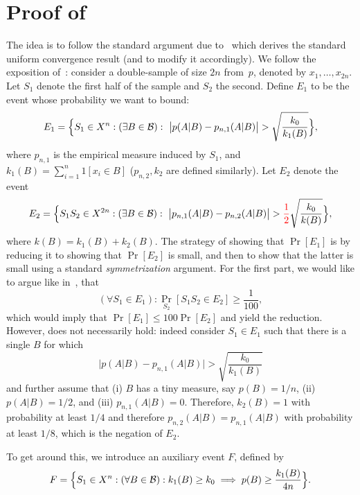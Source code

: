 \documentclass{article}
\newcommand{\B}{{\cal B}}
\newcommand{\new}[1]{\textcolor{red}{#1}}
\begin{document}
\section{Proof of }

The idea is to follow the standard argument due to~\cite{vapnik} 
which derives the standard uniform convergence result (and to modify it accordingly). 
We follow the exposition of~\cite{anthony}:
consider a double-sample of size $2n$ from~$p$, denoted by $x_1,\ldots,x_{2n}$.
Let $S_1$ denote the first half of the sample and $S_2$ the second.
Define $E_1$ to be the event whose probability we want to bound:
\[E_1 = \Bigl\{ S_1\in X^n : (\exists B\in \B):~ 
\bigl\lvert p(A \vert B) - p_{n,1}(A \vert B) \bigr\rvert > 
\sqrt{\frac{k_0}{k_{1}(B)}} \Bigr\},\]
where $p_{n,1}$ is the empirical measure induced by $S_1$, 
and $k_{1}(B)=\sum_{i=1}^n 1[x_i\in B]$ ($p_{n,2}, k_{2}$ are defined similarly).
Let $E_2$ denote the event
\[E_2 = 
\Bigl\{
S_1S_2\in X^{2n} : (\exists B\in\B):~
\bigl\lvert p_{n,1}(A \vert B)   -  p_{n,2}(A \vert B) \bigr\rvert >  
\new{\frac{1}{2}}\sqrt{\frac{k_0}{k(B)}}
\Bigr\},
\]
where $k(B) = k_{1}(B)+k_{2}(B)$.
The strategy of showing that $\Pr[E_1]$ is by reducing it to showing that $\Pr[E_2]$ 
is small, and then to show that the latter is small using a standard \emph{symmetrization} argument. 
For the first part, we would like to argue like in~\cite{anthony}, that
\begin{equation}\label{eq:anthony} 
(\forall S_1\in E_1): \Pr_{S_2}[S_1S_2\in E_2]\geq \frac{1}{100},
\end{equation}
which would imply that $\Pr[E_1]\leq 100\Pr[E_2]$ and yield the reduction.
However,  does not necessarily hold: indeed consider
$S_1\in E_1$ such that there is a single $B$ for which 
\[
\bigl\lvert p(A \vert B) - p_{n,1}(A \vert B) \bigr\rvert > 
\sqrt{\frac{k_0}{k_{1}(B)}}
\]
and further assume that 
(i) $B$ has a tiny measure, say $p(B) = 1/n$,
(ii) $p(A\vert B)= 1/2$, and
(iii) $p_{n,1}(A\vert B) = 0$.
Therefore, $k_2(B)=1$ with probability at least $1/4$
and therefore $p_{n,2}(A \vert B)=p_{n,1}(A \vert B)$
with probability at least $1/8$, which is the negation of $E_2$.

To get around this, we introduce an auxiliary event $F$, defined by
\[F = \Bigl\{S_1\in X^{n} : (\forall B\in\B): k_{1}(B) \geq k_0 \implies p(B)\geq \frac{k_{1}(B)}{4n}\Bigr\}. \]
\end{document}
